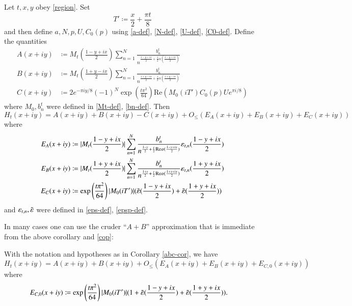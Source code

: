 \begin{corollary}[$A+B-C$ approximation]\label{abc-cor}  Let $t,x,y$ obey \eqref{region}.  Set
\begin{equation}\label{tp-def}
 T' \coloneqq \frac{x}{2} + \frac{\pi t}{8} 
\end{equation}
and then define $a,N,p,U,C_0(p)$ using \eqref{a-def}, \eqref{N-def}, \eqref{U-def}, \eqref{C0-def}.  Define the quantities
\begin{align*}
A(x+iy) &\coloneqq M_t(\frac{1-y+ix}{2}) \sum_{n=1}^N \frac{b_n^t}{n^{\frac{1-y+ix}{2}  +\frac{t}{2} \alpha(\frac{1-y+ix}{2})}}  \\
B(x+iy) &\coloneqq M_t(\frac{1+y-ix}{2}) \sum_{n=1}^N \frac{b_n^t}{n^{\frac{1+y-ix}{2} +\frac{t}{2} \alpha(\frac{1+y-ix}{2})}}  \\
C(x+iy) &\coloneqq  2 e^{-\pi i y/8} (-1)^{N} \exp\left( \frac{t \pi^2}{64}\right) \mathrm{Re}( M_0(iT') C_0(p) U e^{\pi i/8} )
\end{align*}
where $M_0, b_n^t$ were defined in \eqref{Mt-def}, \eqref{bn-def}.
Then
$$ H_t(x+iy) = A(x+iy) + B(x+iy) - C(x+iy) + O_{\leq}(E_A(x+iy) + E_B(x+iy) + E_C(x+iy))$$
where
\begin{align*}
E_A(x+iy) &\coloneqq |M_t(\frac{1-y+ix}{2})| \sum_{n=1}^N \frac{b_n^t}{n^{\frac{1-y}{2}+\frac{t}{2} \mathrm{Re} \alpha(\frac{1-y+ix}{2})}} \varepsilon_{t,n}(\frac{1-y+ix}{2}) \\
E_B(x+iy) &\coloneqq |M_t(\frac{1+y+ix}{2})|\sum_{n=1}^N  \frac{b_n^t}{n^{\frac{1+y}{2}+\frac{t}{2} \mathrm{Re} \alpha(\frac{1+y+ix}{2})}} \varepsilon_{t,n}(\frac{1+y+ix}{2})  \\
E_C(x+iy) &\coloneqq \exp\left( \frac{t \pi^2}{64}\right) |M_0(iT')| (\tilde {\varepsilon}(\frac{1-y+ix}{2}) + \tilde {\varepsilon}(\frac{1+y+ix}{2}))  
\end{align*}
and $\varepsilon_{t,n}, \tilde {\varepsilon}$ were defined in \eqref{eps-def}, \eqref{epsp-def}. 
\end{corollary}

In many cases one can use the cruder ``$A+B$'' approximation that is immediate from the above corollary and \eqref{cop}:

\begin{corollary}[$A+B$ approximation]\label{ab-cor} With the notation and hypotheses as in Corollary \ref{abc-cor}, we have
$$ H_t(x+iy) = A(x+iy) + B(x+iy) + O_{\leq}(E_A(x+iy) + E_B(x+iy) + E_{C,0}(x+iy))$$
where
\begin{align*}
E_{C,0}(x+iy) &\coloneqq \exp\left( \frac{t \pi^2}{64}\right) |M_0(iT')| (1 + \tilde {\varepsilon}(\frac{1-y+ix}{2}) + \tilde {\varepsilon}(\frac{1+y+ix}{2})). 
\end{align*}
\end{corollary}

